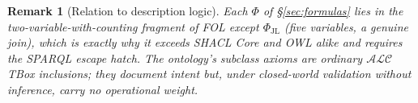 \documentclass[11pt,a4paper]{article}
\newtheorem{remark}[definition]{Remark}
\begin{document}
\begin{remark}[Relation to description logic]
Each $\Phi$ of \S\ref{sec:formulas} lies in the two-variable-with-counting
fragment of FOL except $\Phi_{\mathrm{JL}}$ (five variables, a genuine join),
which is exactly why it exceeds SHACL Core and OWL alike and requires the SPARQL
escape hatch. The ontology's subclass axioms are ordinary $\mathcal{ALC}$ TBox
inclusions; they document intent but, under closed-world validation without
inference, carry no operational weight.
\end{remark}
\end{document}
